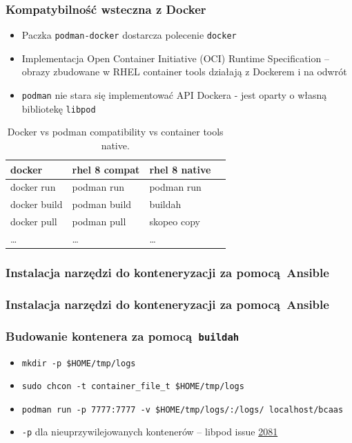 \documentclass[dvipsnames,table]{beamer}
\begin{document}
\begin{frame}
	\frametitle{Kompatybilność wsteczna z Docker}
	\begin{itemize}
		\item Paczka {\tt podman-docker} dostarcza polecenie {\tt docker}
		\item Implementacja Open Container Initiative (OCI) Runtime Specification -- obrazy zbudowane w RHEL container tools działają z Dockerem i na odwrót
		\item {\tt podman} nie stara się implementować API Dockera - jest oparty o własną bibliotekę {\tt libpod}
	\end{itemize}
\centering
	\begin{table}
\caption{Docker vs podman compatibility vs container tools native.}
\label{porownanie}
\scriptsize
\begin{tabular}{llll}
\hline
docker & rhel 8 compat & rhel 8 native   \\ \hline
	docker run & podman run & podman run \\
	docker build & podman build & buildah  \\
	docker pull & podman pull & skopeo copy \\ 
	\ldots & \ldots & \ldots \\ \hline
\end{tabular}
\normalsize
\end{table}
\end{frame}

\begin{frame}[fragile]
	\frametitle{Instalacja narzędzi do konteneryzacji za pomocą Ansible}
	
\end{frame}

\begin{frame}[fragile]
	\frametitle{Instalacja narzędzi do konteneryzacji za pomocą Ansible}
	
\end{frame}

\begin{frame}[fragile]
	\frametitle{Budowanie kontenera za pomocą {\tt buildah}}

\begin{itemize}
	\item {\tt mkdir -p \$HOME/tmp/logs}
	\item {\tt sudo chcon -t container\_file\_t \$HOME/tmp/logs}
	\item {\tt podman run -p 7777:7777 -v \$HOME/tmp/logs/:/logs/ localhost/bcaas}
	\item {\tt -p} dla nieuprzywilejowanych kontenerów -- libpod issue \href{https://github.com/containers/libpod/issues/2081}{2081}
\end{itemize}
\end{frame}
\end{document}
